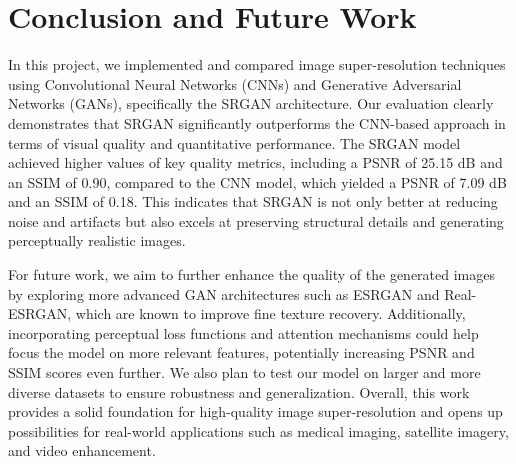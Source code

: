 \chapter{Conclusion and Future Work}
In this project, we implemented and compared image super-resolution techniques using Convolutional Neural Networks (CNNs) and Generative Adversarial Networks (GANs), specifically the SRGAN architecture. Our evaluation clearly demonstrates that SRGAN significantly outperforms the CNN-based approach in terms of visual quality and quantitative performance. The SRGAN model achieved higher values of key quality metrics, including a PSNR of 25.15 dB and an SSIM of 0.90, compared to the CNN model, which yielded a PSNR of 7.09 dB and an SSIM of 0.18. This indicates that SRGAN is not only better at reducing noise and artifacts but also excels at preserving structural details and generating perceptually realistic images.

For future work, we aim to further enhance the quality of the generated images by exploring more advanced GAN architectures such as ESRGAN and Real-ESRGAN, which are known to improve fine texture recovery. Additionally, incorporating perceptual loss functions and attention mechanisms could help focus the model on more relevant features, potentially increasing PSNR and SSIM scores even further. We also plan to test our model on larger and more diverse datasets to ensure robustness and generalization. Overall, this work provides a solid foundation for high-quality image super-resolution and opens up possibilities for real-world applications such as medical imaging, satellite imagery, and video enhancement.